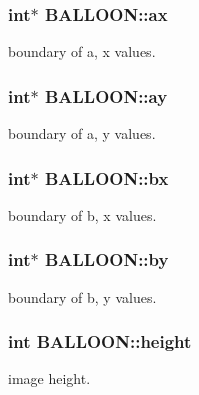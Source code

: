 \subsubsection[{\texorpdfstring{ax}{ax}}]{\setlength{\rightskip}{0pt plus 5cm}int$\ast$ B\+A\+L\+L\+O\+O\+N\+::ax}\hypertarget{struct_b_a_l_l_o_o_n_a16c8dde029c0db3f4cd2b7e5a6f40657}{}\label{struct_b_a_l_l_o_o_n_a16c8dde029c0db3f4cd2b7e5a6f40657}
boundary of a, x values. 
\subsubsection[{\texorpdfstring{ay}{ay}}]{\setlength{\rightskip}{0pt plus 5cm}int$\ast$ B\+A\+L\+L\+O\+O\+N\+::ay}\hypertarget{struct_b_a_l_l_o_o_n_a70c7eb1aef5383b175c39d798bab3542}{}\label{struct_b_a_l_l_o_o_n_a70c7eb1aef5383b175c39d798bab3542}
boundary of a, y values. 
\subsubsection[{\texorpdfstring{bx}{bx}}]{\setlength{\rightskip}{0pt plus 5cm}int$\ast$ B\+A\+L\+L\+O\+O\+N\+::bx}\hypertarget{struct_b_a_l_l_o_o_n_aa164004d293b763232f1cd826ee9e62b}{}\label{struct_b_a_l_l_o_o_n_aa164004d293b763232f1cd826ee9e62b}
boundary of b, x values. 
\subsubsection[{\texorpdfstring{by}{by}}]{\setlength{\rightskip}{0pt plus 5cm}int$\ast$ B\+A\+L\+L\+O\+O\+N\+::by}\hypertarget{struct_b_a_l_l_o_o_n_a812399e00c07b144e6798e47fdd887c2}{}\label{struct_b_a_l_l_o_o_n_a812399e00c07b144e6798e47fdd887c2}
boundary of b, y values. 
\subsubsection[{\texorpdfstring{height}{height}}]{\setlength{\rightskip}{0pt plus 5cm}int B\+A\+L\+L\+O\+O\+N\+::height}\hypertarget{struct_b_a_l_l_o_o_n_aba3e8ab706759466cce70a6a6659db48}{}\label{struct_b_a_l_l_o_o_n_aba3e8ab706759466cce70a6a6659db48}
image height. 
